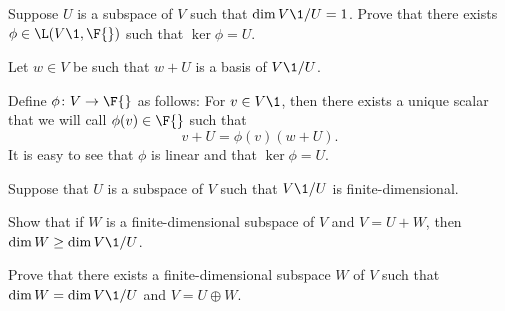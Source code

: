 \exercise
Suppose $U$ is a subspace of $V$ such that $\dim V\1/U = 1$. Prove that there exists $\phi \in \L(V\1, \F{})$ such that $\ker \phi = U$.

\begin{Solution}
Let $w \in V$ be such that $w + U$ is a basis of $V\1/U$.

Define $\phi \colon V \to \F{}$ as follows: For $v \in V\1$, then there exists a unique scalar that we will call $\phi(v) \in \F{}$ such that
\[
v + U = \phi(v)(w + U).
\]
It is easy to see that $\phi$ is linear and that $\ker \phi = U$.
\end{Solution}

\exercise
Suppose that $U$ is a subspace of $V$ such that $V\1/U$ is finite-dimensional.
\begin{subtheorem}
\item
Show that if $W$ is a finite-dimensional subspace of $V$ and \mbox{$V = U + W$}, then $\dim W \ge \dim V\1/U$.
\item
Prove that there exists a finite-dimensional subspace $W$ of $V$ such that \mbox{$\dim W = \dim V\1/U$} and \mbox{$V = U \oplus W$}.
\end{subtheorem}
\exercisesubtheoremend

